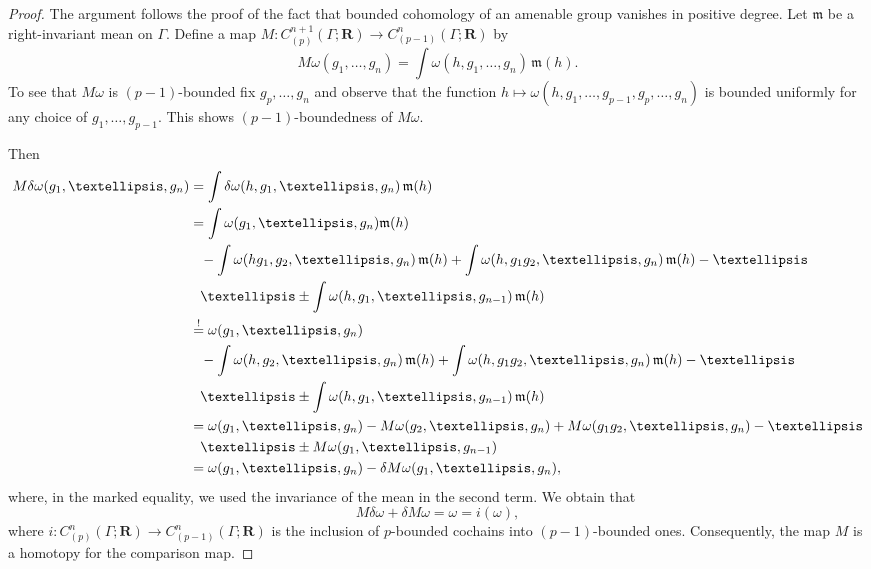 \documentclass[12pt,reqno,a4paper]{amsart}
\theoremstyle{definition}
\theoremstyle{remark}
\newenvironment{remark}
    {\pushQED{\qed}\renewcommand{\qedsymbol}{$\lozenge$}\remarkx}
    {\popQED\endremarkx}
\numberwithin{equation}{section}
\numberwithin{figure}{section}
\newcommand{\B}[1]{{\mathbf #1}}
\newcommand{\F}[1]{{\mathfrak #1}}
\begin{document}
\begin{proof}
The argument follows the proof of the fact that bounded cohomology
of an amenable group vanishes in positive degree.
Let $\F m$ be a right-invariant mean on $\Gamma$.  Define a map
$M \colon C^{n+1}_{(p)}(\Gamma;\B R)\to C^n_{(p-1)}(\Gamma;\B R)$ by
$$
M\omega(g_1,\dots,g_n)=\int\omega(h,g_1,\dots,g_n)\,\F m(h).
$$
To see that $M\omega$ is $(p-1)$-bounded fix $g_p,\ldots,g_n$ and
observe that the function
$h\mapsto \omega(h,g_1,\ldots,g_{p-1},g_p,\ldots,g_n)$
is bounded uniformly for any choice of $g_1,\ldots,g_{p-1}$. 
This shows $(p-1)$-boundedness of $M\omega$.

Then
\begin{align*}
M\delta\omega(g_1,\dots,g_n)
&=\int\delta\omega(h,g_1,\dots,g_n)\,\F m(h)\\
&=\int\omega(g_1,\dots,g_n)\F m(h)\\
&\hphantom{=}-\int\omega(hg_1,g_2,\dots,g_n)\,\F m(h)+\int\omega(h,g_1g_2,\dots,g_n)\,\F m(h)-\dots\\
&\hphantom{=}\dots\pm \int\omega(h,g_1,\ldots,g_{n-1})\,\F m(h)\\
&\overset{!}=\omega(g_1,\dots,g_n)\\
&\hphantom{=}-\int\omega(h,g_2,\dots,g_n)\,\F m(h)+\int\omega(h,g_1g_2,\dots,g_n)\,\F m(h)-\dots\\
&\hphantom{=}\dots\pm \int\omega(h,g_1,\ldots,g_{n-1})\,\F m(h)\\
&=\omega(g_1,\dots,g_n)-M\omega(g_2,\dots,g_n)+M\omega(g_1g_2,\dots,g_n)-\dots\\
&\hphantom{=}\dots\pm M\omega(g_1,\ldots,g_{n-1})\\
&=\omega(g_1,\dots,g_n)-\delta M\omega(g_1,\dots,g_n),
\end{align*}
where, in the marked equality, we used the invariance of the mean 
in the second term.
We obtain that
$$
M\delta\omega+\delta M\omega=\omega=i(\omega),
$$
where $i\colon C^n_{(p)}(\Gamma;\B R)\to C^n_{(p-1)}(\Gamma;\B R)$ is the inclusion
of $p$-bounded cochains into $(p-1)$-bounded ones.
Consequently, the map $M$ is a homotopy for the comparison map.
\end{proof}

\end{document}
